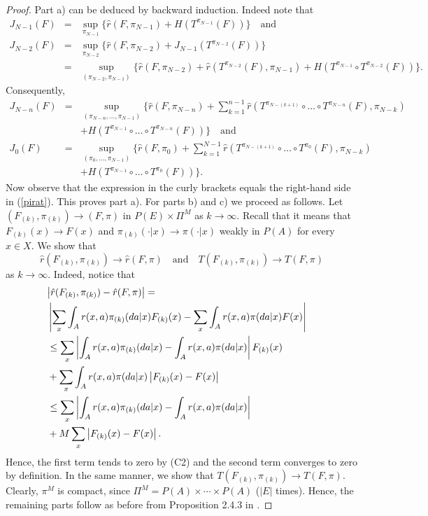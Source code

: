 \documentclass[reqno, 12pt]{amsart}%
\theoremstyle{definition}
\numberwithin{equation}{section} \numberwithin{theorem}{section}
\begin{document}
\begin{proof}
Part a) can be deduced by backward induction. 
Indeed note that
\begin{eqnarray*}
J_{N-1}(F)&=&\sup_{\pi_{N-1}}\Big\{\hat r(F,\pi_{N-1})+H(T^{\pi_{N-1}}(F))\Big\}\quad\mbox{and}\\
J_{N-2}(F)&=&\sup_{\pi_{N-2}}\Big\{\hat r(F,\pi_{N-2})+J_{N-1}(T^{\pi_{N-2}}(F))\Big\}\\
&=&\sup_{(\pi_{N-2},\pi_{N-1})}\Big\{\hat r(F,\pi_{N-2})+
\hat r(T^{\pi_{N-2}}(F),\pi_{N-1})+ H(T^{\pi_{N-1}}\circ T^{\pi_{N-2}}(F))\Big\}.
\end{eqnarray*}
Consequently,
\begin{eqnarray*}
J_{N-n}(F)
&=&\sup_{(\pi_{N-n},\ldots,\pi_{N-1})}\Big\{\hat r(F,\pi_{N-n})+ \sum_{k=1}^{n-1}
\hat r(T^{\pi_{N-(k+1)}}\circ\ldots\circ T^{\pi_{N-n}}(F),\pi_{N-k})\\&&+ H(T^{\pi_{N-1}}\circ \ldots\circ T^{\pi_{N-n}}(F))\Big\} \quad\mbox{and}\\
J_0(F)&=&\sup_{(\pi_{0},\ldots,\pi_{N-1})}\Big\{\hat r(F,\pi_{0})+ \sum_{k=1}^{N-1}
\hat r(T^{\pi_{N-(k+1)}}\circ\ldots\circ T^{\pi_{0}}(F),\pi_{N-k})\\&&+ H(T^{\pi_{N-1}}\circ \ldots\circ T^{\pi_{0}}(F))\Big\}.
\end{eqnarray*}
Now observe that the expression in the curly brackets equals the right-hand side in (\ref{pirat}). This proves  part a).
For parts b) and c) we proceed as follows. 
 Let $(F_{(k)},\pi_{(k)}) \to (F,\pi)$ in $P(E)\times \Pi^M$ 
as $k\to \infty.$ Recall that it means that
$F_{(k)}(x)\to F(x)$  and 
$\pi_{(k)}(\cdot|x)\to\pi(\cdot|x)$ weakly in $P(A)$ for every $x\in X.$ We show that 
$$\hat r(F_{(k)},\pi_{(k)}) \to \hat
r(F,\pi)\quad\mbox{and}\quad T(F_{(k)},\pi_{(k)}) \to 
T(F,\pi)$$
as $k\to\infty.$
Indeed, notice that
 \begin{align*}
\lefteqn{\left| \hat r(F_{(k)},\pi_{(k)}) -
\hat r(F,\pi)\right| =}\\
 &  \left| \sum_{x} \int_A  r(x,a)
 \pi_{(k)}(da|x) F_{(k)}(x) - \sum_{x}\int_A r(x,a)
 \pi(da|x) F(x) \right| \\&
 \le  \sum_{x}  \left| \int_A r(x,a)
 \pi_{(k)}(da|x)  - \int_A  r(x,a)\pi(da|x) 
 \right| F_{(k)}(x) \\
 & +  \sum_{x} \int_A  r(x,a)\pi(da|x) 
 \left|F_{(k)}(x) - F(x)  \right|\\&
 \le  \sum_{x}  \left| \int_A r(x,a)
 \pi_{(k)}(da|x)  - \int_A  r(x,a)\pi(da|x) 
 \right|  \\
 & +  M \sum_{x} 
 \left|F_{(k)}(x) - F(x)  \right|. 
      \end{align*}
Hence, the first term tends to zero by (C2) and
the second term converges to zero by definition. 
In the same manner, we show that  
$T(F_{(k)},\pi_{(k)}) \to T(F,\pi).$
Clearly, $\pi^M$ is compact, since $\Pi^M=P(A)\times\cdots\times P(A)$ ($|E|$ times). Hence, the remaining parts follow as before from Proposition 2.4.3 in \cite{br11}. 
\end{proof}
\end{document}
